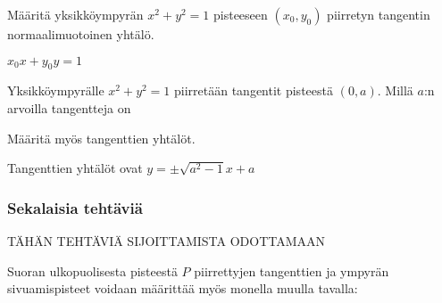 \begin{tehtavasivu}
\begin{tehtava}
Määritä yksikköympyrän $x^2+y^2= 1$ pisteeseen $(x_{0}, y_{0} )$ piirretyn tangentin normaalimuotoinen yhtälö.
\begin{vastaus}
$x_0x+y_0y=1 $
\end{vastaus}
\end{tehtava}

\begin{tehtava}
Yksikköympyrälle $x^2+y^2=1$ piirretään tangentit pisteestä $(0, a)$. Millä $a$:n arvoilla tangentteja on 
\begin{alakohdat}
\end{alakohdat}
Määritä myös tangenttien yhtälöt.
\begin{vastaus}
\begin{alakohdat}
\end{alakohdat}
Tangenttien yhtälöt ovat $ y = \pm \sqrt{a^2-1}x+a$
\end{vastaus}
\end{tehtava}

\begin{tehtava}
\begin{alakohdat}
\end{alakohdat}

\begin{vastaus}
\begin{alakohdat}
\end{alakohdat}
\end{vastaus}
\end{tehtava}

\subsubsection*{Sekalaisia tehtäviä}


TÄHÄN TEHTÄVIÄ SIJOITTAMISTA ODOTTAMAAN

\begin{tehtava}
Suoran ulkopuolisesta pisteestä $P$ piirrettyjen tangenttien ja ympyrän sivuamispisteet voidaan määrittää myös monella muulla tavalla:


\end{tehtava}
\end{tehtavasivu}
